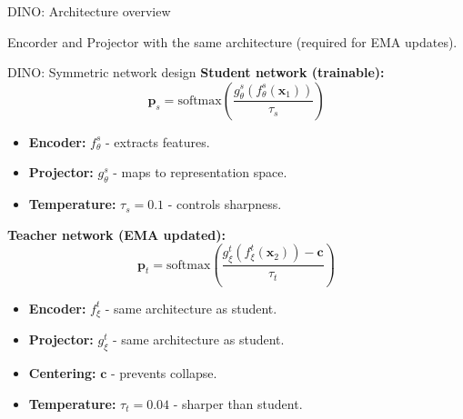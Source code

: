 \documentclass{beamer}
\begin{document}
\begin{frame}{DINO: Architecture overview}
\begin{center}
\end{center}
\vspace{0.5cm}
\alert{Encorder and Projector with the same architecture (required for EMA updates).}

\end{frame}

\begin{frame}{DINO: Symmetric network design}
\textbf{Student network (trainable):}
$$\mathbf{p}_s = \text{softmax}\left(\frac{g_\theta^s(f_\theta^s(\mathbf{x}_1))}{\tau_s}\right)$$
\begin{itemize}
\item \textbf{Encoder:} $f_\theta^s$ - extracts features.
\item \textbf{Projector:} $g_\theta^s$ - maps to representation space.  
\item \textbf{Temperature:} $\tau_s = 0.1$ - controls sharpness.
\end{itemize}

\textbf{Teacher network (EMA updated):}
$$\mathbf{p}_t = \text{softmax}\left(\frac{g_\xi^t(f_\xi^t(\mathbf{x}_2)) - \mathbf{c}}{\tau_t}\right)$$
\begin{itemize}
\item \textbf{Encoder:} $f_\xi^t$ - same architecture as student.
\item \textbf{Projector:} $g_\xi^t$ - same architecture as student.
\item \textbf{Centering:} $\mathbf{c}$ - prevents collapse.
\item \textbf{Temperature:} $\tau_t = 0.04$ - sharper than student.
\end{itemize}

\end{frame}
\end{document}
